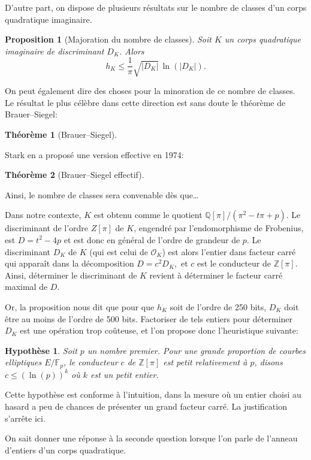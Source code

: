 \documentclass[11pt,a4paper]{article}
\newcommand{\Z}{\mathbb{Z}}
\newcommand{\F}{\mathbb{F}}
\newcommand{\Q}{\mathbb{Q}}
\renewcommand{\O}{\mathcal{O}}
\renewcommand{\v}{\vspace{5mm}}
\newtheorem*{thm}{Théorème}
\newtheorem*{prop}{Proposition}
\newtheorem*{hyp}{Hypothèse}
\theoremstyle{definition}
\begin{document}
D'autre part, on dispose de plusieurs résultats sur le nombre de classes d'un corps quadratique imaginaire.

\begin{prop}[Majoration du nombre de classes]
Soit $K$ un corps quadratique imaginaire de discriminant $D_K$. Alors
$$h_K \leq \frac{1}{\pi} \sqrt{|D_K|}\, \ln(|D_K|).$$
\end{prop}
On peut également dire des choses pour la minoration de ce nombre de classes. Le résultat le plus célèbre dans cette direction est sans doute le théorème de Brauer--Siegel:
\begin{thm}[Brauer--Siegel]

\end{thm}

Stark en a proposé une version effective en 1974:
\begin{thm}[Brauer--Siegel effectif]

\end{thm}
Ainsi, le nombre de classes sera convenable dès que\ldots

\v
Dans notre contexte, $K$ est obtenu comme le quotient $\Q[\pi]/(\pi^2  - t\pi + p)$. Le discriminant de l'ordre $Z[\pi]$ de $K$, engendré par l'endomorphisme de Frobenius, est $D = t^2 - 4 p$ et est donc en général de l'ordre de grandeur de $p$. Le discriminant $D_K$ de $K$ (qui est celui de $\O_K$) est alors l'entier dans facteur carré qui apparaît dans la décomposition $D = c^2 D_K,$ et $c$ est le conducteur de $\Z[\pi]$. Ainsi, déterminer le discriminant de $K$ revient à déterminer le facteur carré maximal de $D$.

Or, la proposition nous dit que pour que $h_K$ soit de l'ordre de 250 bits, $D_K$ doit être au moins de l'ordre de 500 bits. Factoriser de tels entiers pour déterminer $D_K$ est une opération trop coûteuse, et l'on propose donc l'heuristique suivante:

\begin{hyp}
Soit $p$ un nombre premier. Pour une grande proportion de courbes elliptiques $E/\F_p$, le conducteur $c$ de $\Z[\pi]$ est petit relativement à $p$, disons $c\leq (\ln(p))^k$ où $k$ est un petit entier.
\end{hyp}

Cette hypothèse est conforme à l'intuition, dans la mesure où un entier choisi au hasard a peu de chances de présenter un grand facteur carré. La justification s'arrête ici.

\v
On sait donner une réponse à la seconde question lorsque l'on parle de l'anneau d'entiers d'un corps quadratique.
\end{document}
